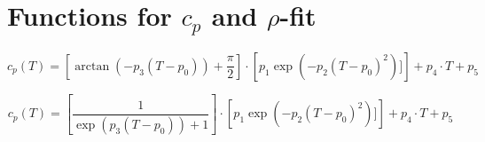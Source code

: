 \documentclass{scrartcl}[12pt, halfparskip]
\begin{document}
\section{Functions for $c_p$ and $\rho$-fit}

\begin{equation*}
	c_p(T) = \left[ \arctan (-p_3 (T-p_0)) + \frac{\pi}{2} \right] \cdot \left[ p_1 \exp(-p_2(T-p_0)^2)] \right] + p_4 \cdot T + p_5 
\end{equation*}


\begin{equation*}
	c_p(T) = \left[ \frac{1}{\exp(p_3(T-p_0)) + 1} \right] \cdot \left[ p_1 \exp(-p_2(T-p_0)^2)] \right] + p_4 \cdot T + p_5 
\end{equation*}
\end{document}
